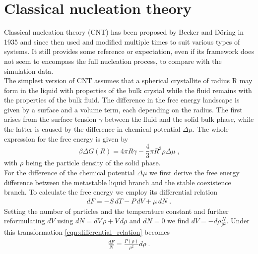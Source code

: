 
\section{Classical nucleation theory }
\label{sec:CNT}
Classical nucleation theory (CNT) has been proposed by Becker and Döring in 1935\cite{Becker1935} and since then used and modified multiple times to suit various types of systems. It still provides some reference or expectation, even if its framework does not seem to encompass the full nucleation process, to compare with the simulation data.\\

The simplest version of CNT assumes that a spherical crystallite of radius R may form in the liquid with properties of the bulk crystal while the fluid remains with the properties of the bulk fluid. The difference in the free energy landscape is given by a surface and a volume term, each depending on the radius. The first arises from the surface tension $\gamma$ between the fluid and the solid bulk phase, while the latter is caused by the difference in chemical potential $\Delta \mu$. The whole expression for the free energy is given by
\begin{equation}
\label{eqn:free_energy}
\beta \Delta G(R) =4 \pi R \gamma -\frac{4}{3} \pi R^3 \rho \Delta \mu  \; \text{,}
\end{equation}
with $\rho$ being the particle density of the solid phase.\\

For the difference of the chemical potential $\Delta \mu $ we first derive the free energy difference between the metastable liquid branch and the stable coexistence branch. To calculate the free energy we employ its differential relation
\begin{align}
\label{eqn:differential_relation}
dF = -S  \, dT -P \, dV + \mu  \, dN \; \text{.}
\end{align}
Setting the number of particles and the temperature constant and further reformulating $dV$ using \linebreak[1] $dN = dV  \, \rho + V  \, d\rho  $ and $dN = 0 $ we find $ dV = -d\rho \frac{N}{\rho^2}$. Under this transformation \autoref{eqn:differential_relation} becomes
\begin{align}
\label{eqn:df_relation}
\frac{dF}{N} = \frac{P(\rho)}{\rho^2} d\rho \; \text{.}
\end{align}

